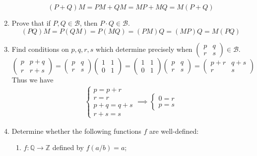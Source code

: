 \begin{enumerate}
\[
        (P+Q)M=PM+QM=MP+MQ=M(P+Q)
\]
    \item Prove that if $P,Q\in\mathcal{B}$, then $P\cdot Q\in\mathcal{B}$.
    \[
        (PQ)M=P(QM)=P(MQ)=(PM)Q=(MP)Q=M(PQ)
\]
    \item Find conditions on $p,q,r,s$ which determine precisely when $\begin{pmatrix}
        p&q\\r&s
    \end{pmatrix}\in\mathcal{B}$.
    \[
    \begin{pmatrix}
        p&p+q\\r&r+s
    \end{pmatrix}=
    \begin{pmatrix}
        p&q\\r&s
    \end{pmatrix}
    \begin{pmatrix}
        1&1\\0&1
    \end{pmatrix}
    =
    \begin{pmatrix}
        1&1\\0&1
    \end{pmatrix}
    \begin{pmatrix}
        p&q\\r&s
    \end{pmatrix}
    =
    \begin{pmatrix}
        p+r&q+s\\r&s
    \end{pmatrix}
\]
Thus we have 
\begin{align*}
    \begin{cases}
        p=p+r\\
        r=r\\
        p+q=q+s\\
        r+s=s
    \end{cases}
    \implies
    \begin{cases}
        0=r\\
        p=s
    \end{cases}
\end{align*}
    \item Determine whether the following functions $f$ are well-defined:
    \begin{enumerate}
        \item $f : \mathbb{Q} \to \mathbb{Z}$ defined by $f(a/b) = a$;
        

\end{enumerate}
\end{enumerate}
